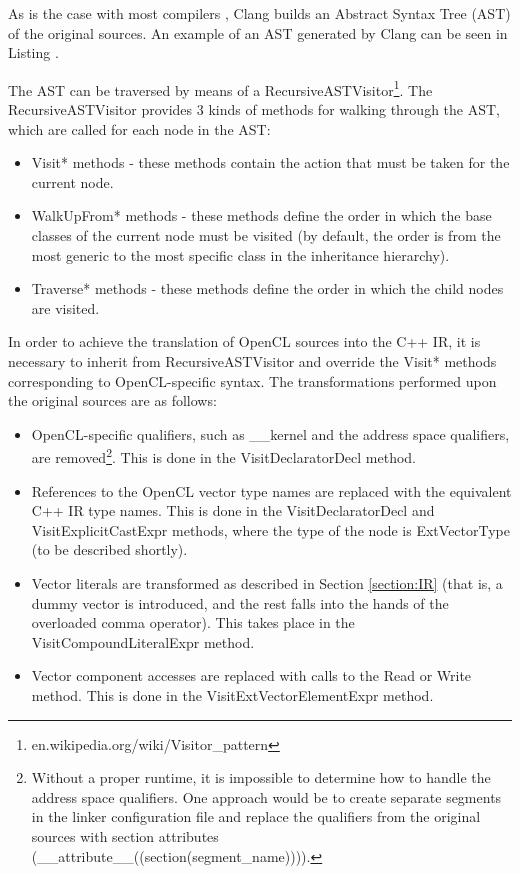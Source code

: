 As is the case with most compilers \cite{engcompiler}, Clang builds an Abstract Syntax Tree (AST) of the original sources. An example of an AST generated by Clang can be seen in Listing .

The AST can be traversed by means of a RecursiveASTVisitor\footnote{en.wikipedia.org/wiki/Visitor\_pattern}. The RecursiveASTVisitor provides 3 kinds of methods for walking through the AST, which are called for each node in the AST:
\begin{itemize}
\item Visit* methods - these methods contain the action that must be taken for the current node.
\item WalkUpFrom* methods - these methods define the order in which the base classes of the current node must be visited (by default, the order is from the most generic to the most specific class in the inheritance hierarchy).
\item Traverse* methods - these methods define the order in which the child nodes are visited.
\end{itemize}

In order to achieve the translation of OpenCL sources into the C++ IR, it is necessary to inherit from RecursiveASTVisitor and override the Visit* methods corresponding to OpenCL-specific syntax. The transformations performed upon the original sources are as follows:
\begin{itemize}
\item OpenCL-specific qualifiers, such as \_\_kernel and the address space qualifiers, are removed\footnote{Without a proper runtime, it is impossible to determine how to handle the address space qualifiers. One approach would be to create separate segments in the linker configuration file and replace the qualifiers from the original sources with section attributes (\_\_attribute\_\_((section(segment\_name)))).}. This is done in the VisitDeclaratorDecl method.
\item References to the OpenCL vector type names are replaced with the equivalent C++ IR type names. This is done in the VisitDeclaratorDecl and VisitExplicitCastExpr methods, where the type of the node is ExtVectorType (to be described shortly).
\item Vector literals are transformed as described in Section \ref{section:IR} (that is, a dummy vector is introduced, and the rest falls into the hands of the overloaded comma operator). This takes place in the VisitCompoundLiteralExpr method.
\item Vector component accesses are replaced with calls to the Read or Write method. This is done in the VisitExtVectorElementExpr method.
\end{itemize}

